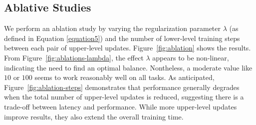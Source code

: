\begin{table}[!t]
\centering
{}
\caption{Multi-task Meta learning results using GPT2-Large as the base model. Values correspond to the mean and standard deviation over 5 test seeds which include different demonstration samples for each test task. class: Classification, qa: Question Answering}
\label{tab:meta-learning}
\end{table}


\subsection{Ablative Studies}
We perform an ablation study by varying the regularization parameter $\lambda$ (as defined in Equation \eqref{equation5}) and the number of lower-level training steps between each pair of upper-level updates. Figure~\ref{fig:ablation} shows the results. From Figure~\ref{fig:ablations-lambda}, the effect $\lambda$ appears to be non-linear, indicating the need to find an optimal balance. Nontheless, a moderate value like $10$ or $100$ seems to work reasonably well on all tasks.
As anticipated, Figure~\ref{fig:ablation-steps} demonstrates that performance generally degrades when the total number of upper-level updates is reduced, suggesting there is a trade-off between latency and performance. While more upper-level updates improve results, they also extend the overall training time.



